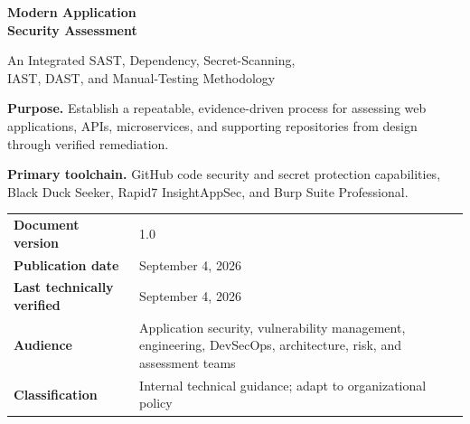 \documentclass[11pt,letterpaper]{article}
\begin{document}
\hypersetup{pageanchor=false}
\begin{titlepage}
\vspace*{0.72in}
{\sffamily\color{white}\fontsize{29}{34}\selectfont\bfseries Modern Application\\Security Assessment\par}
\vspace{0.28in}
{\sffamily\color{white}\Large An Integrated SAST, Dependency, Secret-Scanning,\\IAST, DAST, and Manual-Testing Methodology\par}

\vspace{1.25in}
\begin{tcolorbox}[colback=Cloud,colframe=Blue,boxrule=0.8pt,arc=2mm,left=5mm,right=5mm,top=4mm,bottom=4mm]
\textbf{Purpose.} Establish a repeatable, evidence-driven process for assessing web applications, APIs, microservices, and supporting repositories from design through verified remediation.

\textbf{Primary toolchain.} GitHub code security and secret protection capabilities, Black Duck Seeker, Rapid7 InsightAppSec, and Burp Suite Professional.
\end{tcolorbox}

\vfill
\begin{tabularx}{\textwidth}{@{}L{1.65in}Y@{}}
\toprule
\textbf{Document version} & 1.0 \\
\textbf{Publication date} & September 4, 2026 \\
\textbf{Last technically verified} & September 4, 2026 \\
\textbf{Audience} & Application security, vulnerability management, engineering, DevSecOps, architecture, risk, and assessment teams \\
\textbf{Classification} & Internal technical guidance; adapt to organizational policy \\
\bottomrule
\end{tabularx}
\end{titlepage}
\hypersetup{pageanchor=true}

\end{document}
